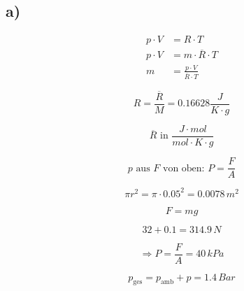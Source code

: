

\subsection*{a)}

\begin{align*}
p \cdot V &= R \cdot T \\
p \cdot V &= m \cdot \overline{R} \cdot T \\
m &= \frac{p \cdot V}{\overline{R} \cdot T}
\end{align*}

\[
R = \frac{\overline{R}}{M} = 0.16628 \frac{J}{K \cdot g}
\]

\[
\overline{R} \text{ in } \frac{J \cdot mol}{mol \cdot K \cdot g}
\]

\[
p \text{ aus } F \text{ von oben: } P = \frac{F}{A}
\]

\[
\pi r^2 = \pi \cdot 0.05^2 = 0.0078 \, m^2
\]

\[
F = mg
\]

\[
32 + 0.1 = 314.9 \, N
\]

\[
\Rightarrow P = \frac{F}{A} = 40 \, kPa
\]

\[
p_{\text{ges}} = p_{\text{amb}} + p = 1.4 \, Bar
\]